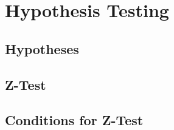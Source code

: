 \documentclass[../main]{subfiles}
\begin{document}
\section{Hypothesis Testing}

\subsection{Hypotheses}

\subsection{Z-Test}

\subsection{Conditions for Z-Test}
\end{document}
